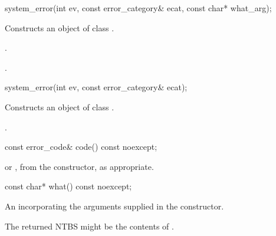 %
\begin{itemdecl}
system_error(int ev, const error_category& ecat,
  const char* what_arg);
\end{itemdecl}

\begin{itemdescr}
\pnum
\effects Constructs an object of class .

\pnum
\postconditions {}.

.
\end{itemdescr}

%
\begin{itemdecl}
system_error(int ev, const error_category& ecat);
\end{itemdecl}

\begin{itemdescr}
\pnum
\effects Constructs an object of class .

\pnum
\postconditions {}.
\end{itemdescr}

%
\begin{itemdecl}
const error_code& code() const noexcept;
\end{itemdecl}

\begin{itemdescr}
\pnum
\returns {} or , from the constructor,
as appropriate.
\end{itemdescr}

%
\begin{itemdecl}
const char* what() const noexcept;
\end{itemdecl}

\begin{itemdescr}
\pnum
\returns An \ntbs incorporating the arguments supplied in the constructor.

\begin{note} The returned NTBS might be the contents of .\end{note}
\end{itemdescr}

